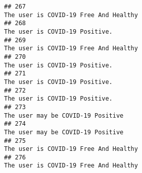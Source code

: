 \documentclass[
]{article}
\begin{document}
\begin{verbatim}
## 267                                                                                                                                                                                                                              The user is COVID-19 Free And Healthy
## 268                                                                                                                                                                                                                                     The user is COVID-19 Positive.
## 269                                                                                                                                                                                                                              The user is COVID-19 Free And Healthy
## 270                                                                                                                                                                                                                                     The user is COVID-19 Positive.
## 271                                                                                                                                                                                                                                     The user is COVID-19 Positive.
## 272                                                                                                                                                                                                                                     The user is COVID-19 Positive.
## 273                                                                                                                                                                                                                                  The user may be COVID-19 Positive
## 274                                                                                                                                                                                                                                  The user may be COVID-19 Positive
## 275                                                                                                                                                                                                                              The user is COVID-19 Free And Healthy
## 276                                                                                                                                                                                                                              The user is COVID-19 Free And Healthy

\end{verbatim}
\end{document}
